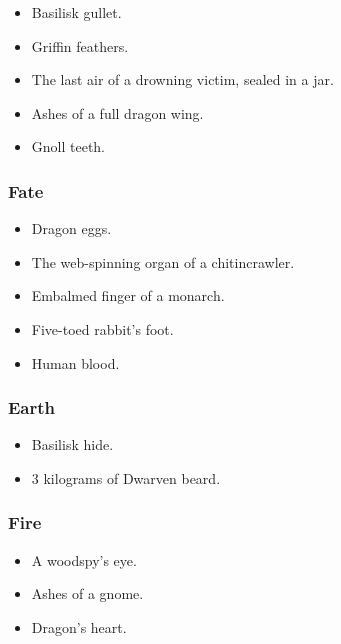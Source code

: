 \begin{multicols}{2}
\begin{itemize}
  \item
  Basilisk gullet.
  \item
  Griffin feathers.
  \item
  The last air of a drowning victim, sealed in a jar.
  \item
  Ashes of a full dragon wing.
  \item
  Gnoll teeth.
\end{itemize}

\subsubsection{Fate}

\begin{itemize}
  \item
  Dragon eggs.
  \item
  The web-spinning organ of a chitincrawler.
  \item
  Embalmed finger of a monarch.
  \item
  Five-toed rabbit's foot.
  \item
  Human blood.
\end{itemize}

\subsubsection{Earth}

\begin{itemize}
  \item
  Basilisk hide.
  \item
  3 kilograms of Dwarven beard.
\end{itemize}

\subsubsection{Fire}

\begin{itemize}
  \item
  A woodspy's eye.
  \item
  Ashes of a gnome.
  \item
  Dragon's heart.
\end{itemize}


\end{multicols}
